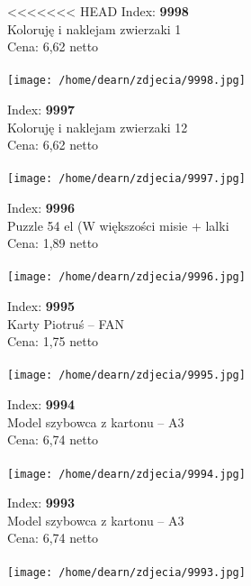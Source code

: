 
<<<<<<< HEAD
{Index: \textbf{9998}\\
Koloruję i naklejam zwierzaki 1 \\
Cena: 6,62 netto   \\\\  \texttt{[image: /home/dearn/zdjecia/9998.jpg]}}\newline\newline

{Index: \textbf{9997}\\
Koloruję i naklejam zwierzaki 12\\
Cena: 6,62 netto   \\\\  \texttt{[image: /home/dearn/zdjecia/9997.jpg]}}\newline\newline

{Index: \textbf{9996}\\
Puzzle 54 el (W większości misie + lalki\\
Cena: 1,89 netto   \\\\  \texttt{[image: /home/dearn/zdjecia/9996.jpg]}}\newline\newline

{Index: \textbf{9995}\\
Karty Piotruś – FAN\\
Cena: 1,75 netto   \\\\  \texttt{[image: /home/dearn/zdjecia/9995.jpg]}}\newline\newline

{Index: \textbf{9994}\\
Model szybowca z kartonu – A3\\
Cena: 6,74 netto   \\\\  \texttt{[image: /home/dearn/zdjecia/9994.jpg]}}\newline\newline

{Index: \textbf{9993}\\
Model szybowca z kartonu – A3\\
Cena: 6,74 netto   \\\\  \texttt{[image: /home/dearn/zdjecia/9993.jpg]}}\newline\newline

